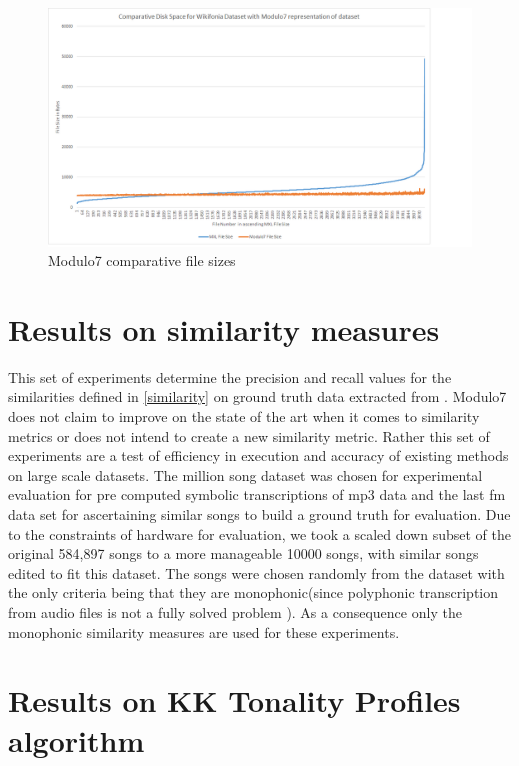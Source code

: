 \begin{figure}
\centering
\includegraphics[width=\textwidth]{M7Graph.png}
\makeatletter
\let\@currsize\normalsize
\caption{Modulo7 comparative file sizes}
\label{fig:figure}
\end{figure}

\section{Results on similarity measures}

\noindent This set of experiments determine the precision and recall values for the similarities defined in \ref{similarity} on ground truth data extracted from \cite{msd}. Modulo7 does not claim to improve on the state of the art when it comes to similarity metrics or does not intend to create a new similarity metric. Rather this set of experiments are a test of efficiency in execution and accuracy of existing methods on large scale datasets. The million song dataset was chosen for experimental evaluation \cite{msd} for pre computed symbolic transcriptions of mp3 data and the last fm data set for ascertaining similar songs to build a ground truth for evaluation. Due to the constraints of hardware for evaluation, we took a scaled down subset of the original 584,897 songs to a more manageable 10000 songs, with similar songs edited to fit this dataset. The songs were chosen randomly from the dataset with the only criteria being that they are monophonic(since polyphonic transcription from audio files is not a fully solved problem \cite{melextract}). As a consequence only the monophonic similarity measures are used for these experiments. 

\section{Results on KK Tonality Profiles algorithm}

